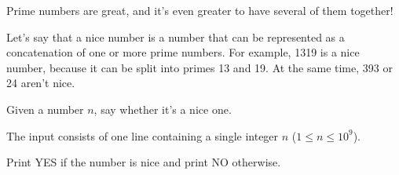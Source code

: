 \problemname{\problemyamlname}


\newcommand{\minn}{1}
\newcommand{\maxn}{10^{9}}

Prime numbers are great, and it's even greater to have several of them together!

Let's say that a nice number is a number that can be represented as a concatenation of one or more prime numbers. For example, 1319 is a nice number, because it can be split into primes 13 and 19. At the same time, 393 or 24 aren't nice.

Given a number $n$, say whether it's a nice one.

\begin{Input}
    The input consists of one line containing a single integer $n$ ($\minn\leq n\leq \maxn$).
\end{Input}

\begin{Output}
    Print YES if the number is nice and print NO otherwise.
\end{Output}
